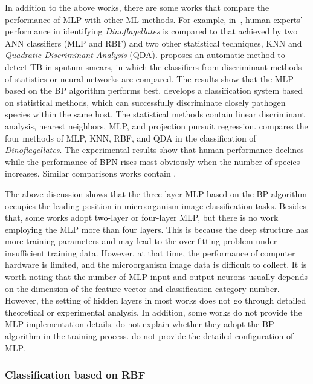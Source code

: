 In addition to the above works, there are some works that compare the performance of MLP with other ML methods. For example, in~\cite{Culverhouse-1996-ACFD}, human experts' performance in identifying \emph{Dinoflagellates} is compared to that achieved by two ANN classifiers (MLP and RBF) and two other statistical techniques, KNN and \emph{Quadratic Discriminant Analysis} (QDA). \cite{Veropoulos-1998-IPNC} proposes an automatic method to detect TB in sputum smears, in which the classifiers from discriminant methods of statistics or neural networks are compared. The results show that the MLP based on the BP algorithm performs best. \cite{Kay-1999-TAAS} develops a classification system based on statistical methods, which can successfully discriminate closely pathogen species within the same host. The statistical methods contain linear discriminant analysis, nearest neighbors, MLP, and projection pursuit regression. \cite{Culverhouse-2000-DAMV} compares the four methods of MLP, KNN, RBF, and QDA in the classification of \emph{Dinoflagellates}. The experimental results show that human performance declines while the performance of BPN rises most obviously when the number of species increases. 
Similar comparisons works contain \cite{Ginoris-2006-RPMU,Kiranyaz-2011-CRMI,Kruk-2015-CCSI,Priya-2016-AOIL}.

The above discussion shows that the three-layer MLP based on the BP algorithm occupies the leading position in microorganism image classification tasks. Besides that, some works adopt two-layer or four-layer MLP, but there is no work employing the MLP more than four layers. This is because the deep structure has more training parameters and may lead to the over-fitting problem under insufficient training data. However, at that time, the performance of computer hardware is limited, and the microorganism image data is difficult to collect. It is worth noting that the number of MLP input and output neurons usually depends on the dimension of the feature vector and classification category number. However, the setting of hidden layers in most works does not go through detailed theoretical or experimental analysis. In addition, some works do not provide the MLP implementation details. \cite{Balfoort-1992-AIAN,Zeder-2010-AQAA} do not explain whether they adopt the BP algorithm in the training process. \cite{Rulaningtyas-2011-ACTB,Osman-2011-TBDZ,Osman-2012-OSEL} do not provide the detailed configuration of MLP.


\subsubsection{Classification based on RBF}

